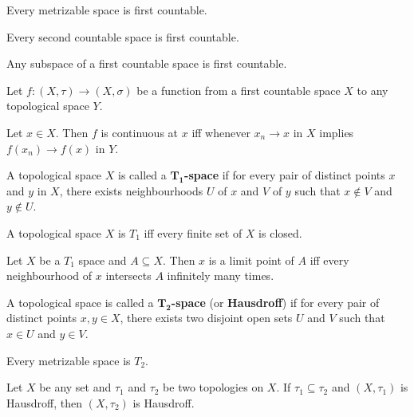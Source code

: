 \begin{thm}
    Every metrizable space is first countable.
\end{thm}

\begin{thm}
    Every second countable space is first countable.
\end{thm}

\begin{thm}
    Any subspace of a first countable space is first countable.
\end{thm}

\begin{thm}
    Let $f:(X,\tau) \to (X, \sigma)$ be a function from a first countable space $X$ to any topological space $Y$.

    Let $x \in X$. Then $f$ is continuous at $x$ iff whenever $x_n \to x$ in $X$ implies $f(x_n) \to f(x)$ in $Y$.
\end{thm}

\begin{defn}
    A topological space $X$ is called a \textbf{$\bm{T_1}$-space} if for every pair of distinct points $x$ and $y$ in $X$, there exists neighbourhoods $U$ of $x$ and $V$ of $y$ such that $x \notin V$ and $y \notin U$.
\end{defn}

\begin{thm}
    A topological space $X$ is $T_1$ iff every finite set of $X$ is closed.
\end{thm}

\begin{thm}
    Let $X$ be a $T_1$ space and $A \subseteq X$. Then $x$ is a limit point of $A$ iff every neighbourhood of $x$ intersects $A$ infinitely many times.
\end{thm}

\begin{defn}
    A topological space is called a \textbf{$\bm{T_2}$-space} (or \textbf{Hausdroff}) if for every pair of distinct points $x, y \in X$, there exists two disjoint open sets $U$ and $V$ such that $x \in U$ and $y \in V$.
\end{defn}

\begin{note}
    Every metrizable space is $T_2$.
\end{note}

\begin{thm}
    Let $X$ be any set and $\tau_1$ and $\tau_2$ be two topologies on $X$. If $\tau_1 \subseteq \tau_2$ and $(X,\tau_1)$ is Hausdroff, then $(X,\tau_2)$ is Hausdroff.
\end{thm}

